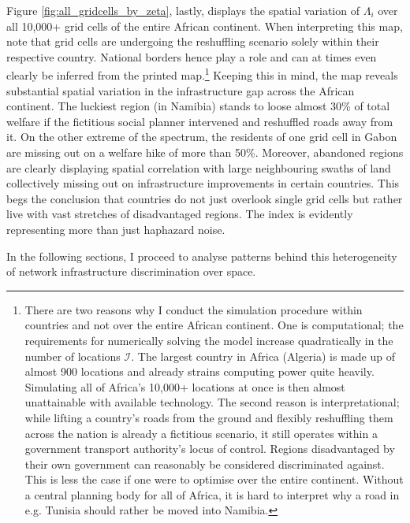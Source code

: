 \documentclass[11pt, oneside]{article}   	%
\begin{document}
Figure \eqref{fig:all_gridcells_by_zeta}, lastly, displays the spatial variation of $\Lambda_{i}$ over all 10,000+ grid cells of the entire African continent. When interpreting this map, note that grid cells are undergoing the reshuffling scenario solely within their respective country. National borders hence play a role and can at times even clearly be inferred from the printed map.\footnote{There are two reasons why I conduct the simulation procedure within countries and not over the entire African continent. One is computational; the requirements for numerically solving the model increase quadratically in the number of locations $\mathcal{I}$. The largest country in Africa (Algeria) is made up of almost 900 locations and already strains computing power quite heavily. Simulating all of Africa's 10,000+ locations at once is then almost unattainable with available technology. The second reason is interpretational; while lifting a country's roads from the ground and flexibly reshuffling them across the nation is already a fictitious scenario, it still operates within a government transport authority's locus of control. Regions disadvantaged by their own government can reasonably be considered discriminated against. This is less the case if one were to optimise over the entire continent. Without a central planning body for all of Africa, it is hard to interpret why a road in e.g. Tunisia should rather be moved into Namibia.}  Keeping this in mind, the map reveals substantial spatial variation in the infrastructure gap across the African continent. The luckiest region (in Namibia) stands to loose almost 30\% of total welfare if the fictitious social planner intervened and reshuffled roads away from it. On the other extreme of the spectrum, the residents of one grid cell in Gabon are missing out on a welfare hike of more than 50\%. Moreover, abandoned regions are clearly displaying spatial correlation with large neighbouring swaths of land collectively missing out on infrastructure improvements in certain countries. This begs the conclusion that countries do not just overlook single grid cells but rather live with vast stretches of disadvantaged regions. The index is evidently representing more than just haphazard noise.

In the following sections, I proceed to analyse patterns behind this heterogeneity of network infrastructure discrimination over space.
\end{document}
